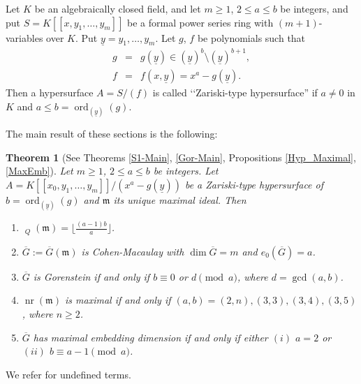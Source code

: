 \documentclass[12pt]{amsart}
\newtheorem{thm}{Theorem}[section]
\theoremstyle{definition}
\theoremstyle{remark}
\numberwithin{equation}{section}
\newcommand{\m}{{\mathfrak m}}
\DeclareMathOperator{\nr}{{nr}}
\DeclareMathOperator{\br}{\bar r}
\DeclareMathOperator{\ord}{ord}
\begin{document}
\par \vspace{2mm}
Let $K$ be an algebraically closed field, and 
let $m \ge 1$, $2 \le a \le b$ be integers, 
and put $S=K[\![x, y_1,\ldots, y_m]\!]$ be a formal power series ring
with $(m+1)$-variables over $K$.  
Put $\underline{y}=y_1,\ldots,y_m$. 
Let $g$, $f$  be polynomials such that  
\begin{eqnarray*}
g &= & g(\underline{y}) \in (\underline{y})^b 
\setminus (\underline{y})^{b+1}, \\
f &=& f(x,\underline{y})=x^a-g(\underline{y}).
\end{eqnarray*}
Then a hypersurface $A=S/(f)$  
is called \lq\lq Zariski-type hypersurface'' if $a \ne 0$ in $K$ 
and $a \le b=\ord_{(\underline{y})}(g)$. 
\par \vspace{2mm}
The main result of these sections is the following:

\par \vspace{2mm} \par \noindent 
\begin{thm}[See Theorems \ref{S1-Main}, \ref{Gor-Main}, Propositions \ref{Hyp_Maximal}, \ref{MaxEmb}] \label{thm:GGorhyp}
Let $m \ge 1$, $2 \le a \le b$ be integers.  
Let $A=K[[x_0,y_1,\ldots,y_m]]/(x^a -g(\underline{y}))$ be 
a Zariski-type hypersurface of $b=\ord_{(\underline{y})}(g)$ 
and $\m$ its unique maximal ideal. 
Then 
\begin{enumerate}
\item[\rm{(a)}] $\br_Q(\m)=\lfloor \frac{(a-1)b}{a} \rfloor$. 
\item[\rm{(b)}] $\overline{G}:=\overline{G}(\m)$ is Cohen-Macaulay with 
$\dim \overline{G}=m$ and $e_0(\overline{G})=a$. 
\item[\rm{(c)}] $\overline{G}$ is Gorenstein if and only if $b \equiv 0$ 
or $d \pmod{a}$, where $d =\gcd(a,b)$. 
\item[\rm{(d)}] $\nr(\m)$ is maximal if and only if $(a,b)=(2,n),(3,3),(3,4),(3,5)$, where $n \ge 2$. 
\item[\rm{(e)}] 
$\overline{G}$ has maximal embedding dimension if and only if either $(i)$ $a=2$ or $(ii)$ $b \equiv a-1 \pmod{a}$. 
\end{enumerate}
\end{thm}

\par   
We refer \cite{BH98} for undefined terms.
\end{document}
